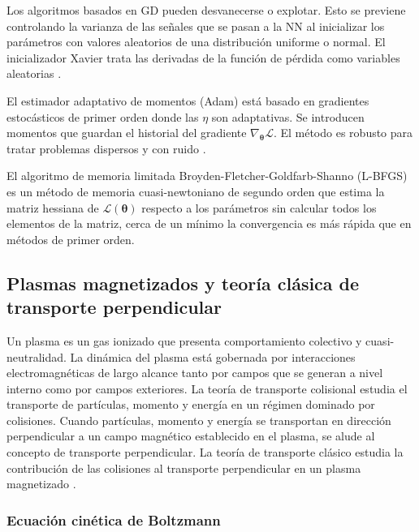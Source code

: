 Los algoritmos basados en GD pueden desvanecerse o explotar. Esto se previene controlando la varianza de las señales que se pasan a la NN al inicializar los parámetros con valores aleatorios de una distribución uniforme o normal. El inicializador Xavier trata las derivadas de la función de pérdida como variables aleatorias \cite{glorot2010}.

El estimador adaptativo de momentos (Adam) está basado en gradientes estocásticos de primer orden donde las $\eta$ son adaptativas. Se introducen momentos que guardan el historial del gradiente $\nabla_{\bm{\theta}} \mathcal{L}$. El método es robusto para tratar problemas dispersos y con ruido \cite{kingma2017}.

El algoritmo de memoria limitada Broyden-Fletcher-Goldfarb-Shanno (L-BFGS) es un método de memoria cuasi-newtoniano de segundo orden que estima la matriz hessiana de $\mathcal{L}(\bm{\theta})$ respecto a los parámetros sin calcular todos los elementos de la matriz, cerca de un mínimo la convergencia es más rápida que en métodos de primer orden. 

\subsection{Plasmas magnetizados y teoría clásica de transporte perpendicular}

Un plasma es un gas ionizado que presenta comportamiento colectivo y cuasi-neutralidad. La dinámica del plasma está gobernada por interacciones electromagnéticas de largo alcance tanto por campos que se generan a nivel interno como por campos exteriores. La teoría de transporte colisional estudia el transporte de partículas, momento y energía  en un régimen dominado por colisiones. Cuando partículas, momento y energía se transportan en dirección perpendicular a un campo magnético establecido en el plasma, se alude al concepto de transporte perpendicular. La teoría de transporte clásico estudia la contribución de las colisiones al transporte perpendicular en un plasma magnetizado \cite{helander2005}.

\subsubsection{Ecuación cinética de Boltzmann}


